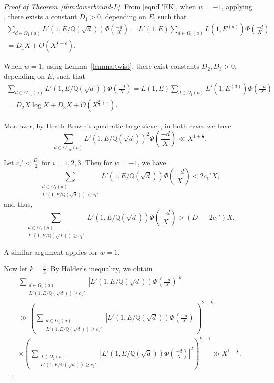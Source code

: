 \documentclass[12pt,reqno]{amsart}
\numberwithin{equation}{section}
\theoremstyle{plain}
\theoremstyle{definition}
\theoremstyle{remark}
\begin{document}
\begin{proof}[Proof of Theorem~\ref{thm:lowerbound-L}]
From \eqref{eqn:L'EK}, when \( w = -1 \),
applying \cite[Proposition~2]{RadziwillSoundararajan2015}, there exists a constant \( D_1 > 0 \), depending on \( E \), such that
\begin{multline*}
\sum_{d \in \Omega_{1}(a)}
L'(1, E/\mathbb{Q}(\sqrt{d}))
\Phi\left(\frac{-d}{X}\right)
=
L'(1, E)
\sum_{d \in \Omega_{1}(a)} L(1, E^{(d)})
\Phi\left(\frac{-d}{X}\right)
\\= D_1 X + O\left(X^{\frac{7}{8}+\varepsilon}\right).
\end{multline*}

When \( w = 1 \), using Lemma~\ref{lemma:twist}, there exist constants \( D_2, D_3 > 0 \), depending on \( E \), such that
\begin{multline*}
\sum_{d \in \Omega_{-1}(a)}
L'(1, E/\mathbb{Q}(\sqrt{d}))
\Phi\left(\frac{-d}{X}\right)
=
L(1, E)
\sum_{d \in \Omega_{1}(a)}
L'(1, E^{(d)})
\Phi\left(\frac{-d}{X}\right)
\\= D_2 X \log X + D_3 X + O\left(X^{\frac{3}{4}+\varepsilon}\right).
\end{multline*}

Moreover, by Heath-Brown's quadratic large sieve~\cite{HeathBrown1995}, in both cases we have
\[
\sum_{d \in \Omega_{-w}(a)}
L'(1, E/\mathbb{Q}(\sqrt{d}))^2
\Phi\left(\frac{-d}{X}\right)
\ll X^{1 + \frac{\varepsilon}{2}}.
\]

Let \( c_i'< \frac{D_i}{2} \) for \( i = 1, 2, 3 \). Then for \( w = -1 \), we have
\[
\sum_{\substack{d \in \Omega_1(a) \\ L'(1, E/\mathbb{Q}(\sqrt{d})) < c_1'}}
L'(1, E/\mathbb{Q}(\sqrt{d}))
\Phi\left(\frac{-d}{X}\right)
< 2c_1' X,
\]
and thus,
\[
\sum_{\substack{d \in \Omega_1(a) \\ L'(1, E/\mathbb{Q}(\sqrt{d})) \geq c_1'}}
L'(1, E/\mathbb{Q}(\sqrt{d}))
\Phi\left(\frac{-d}{X}\right)
> (D_1 - 2c_1') X.
\]

A similar argument applies for \( w = 1 \).

Now let \( k = \frac{\varepsilon}{3} \). By H\"older's inequality, we obtain
\begin{multline*}
\sum_{\substack{d \in \Omega_1(a) \\ L'(1, E/\mathbb{Q}(\sqrt{d})) \geq c_1'}}
\left|L'(1, E/\mathbb{Q}(\sqrt{d}))
\Phi\left(\frac{-d}{X}\right)\right|^k
\\ \gg
\left(
\sum_{\substack{d \in \Omega_1(a) \\ L'(1, E/\mathbb{Q}(\sqrt{d})) \geq c_1'}}
\left|L'(1, E/\mathbb{Q}(\sqrt{d}))
\Phi\left(\frac{-d}{X}\right)\right|
\right)^{2 - k}
\\ \times \left(
\sum_{\substack{d \in \Omega_1(a) \\ L'(1, E/\mathbb{Q}(\sqrt{d})) \geq c_1'}}
\left|L'(1, E/\mathbb{Q}(\sqrt{d}))
\Phi\left(\frac{-d}{X}\right)\right|^2
\right)^{k - 1}
\gg X^{1 - \frac{\varepsilon}{2}}.
\end{multline*}


\end{proof}
\end{document}
